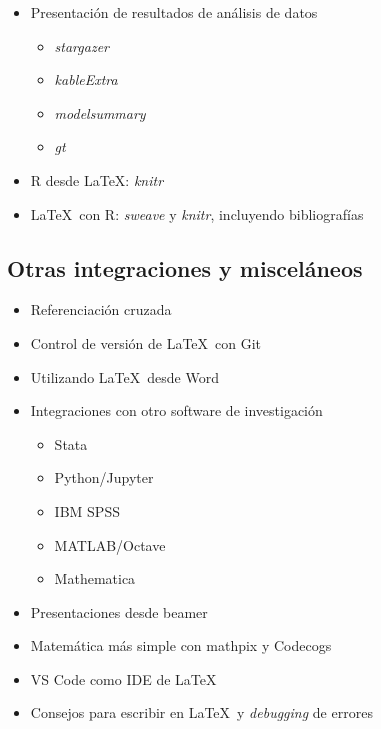 \documentclass[a4paper,12pt]{article}
\begin{document}
\begin{itemize}
    \item Presentación de resultados de análisis de datos
        \begin{itemize}
            \item \textit{stargazer}
            \item \textit{kableExtra}
            \item \textit{modelsummary}
            \item \textit{gt}
        \end{itemize}
    \item R desde \LaTeX: \textit{knitr}
    \item \LaTeX \ con R: \textit{sweave} y \textit{knitr}, incluyendo bibliografías
\end{itemize}

\subsection{Otras integraciones y misceláneos}

\begin{itemize}
    \item Referenciación cruzada
    \item Control de versión de \LaTeX \ con Git
    \item Utilizando \LaTeX \ desde Word
    \item Integraciones con otro software de investigación
    \begin{itemize}
        \item Stata
        \item Python/Jupyter
        \item IBM SPSS
        \item MATLAB/Octave
        \item Mathematica
    \end{itemize}
    \item Presentaciones desde beamer
    \item Matemática más simple con mathpix y Codecogs
    \item VS Code como IDE de \LaTeX
    \item Consejos para escribir en \LaTeX \ y \textit{debugging} de errores
\end{itemize}

\printbibliography[title=Material de Referencia]
\end{document}
